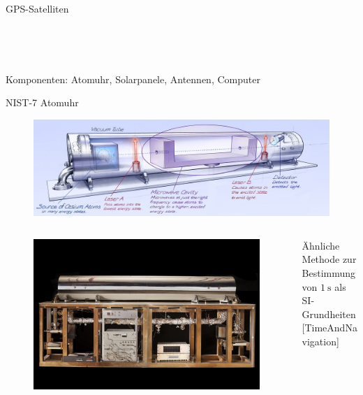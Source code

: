 \begin{frame}{GPS-Satelliten}
\begin{columns}
\begin{column}{0.5\textwidth}
\begin{figure}
            \end{figure}
        \end{column}
    \end{columns}~\\~\\
    Komponenten: Atomuhr, Solarpanele, Antennen, Computer \;
\end{frame}

\begin{frame}{NIST-7 Atomuhr}
    \begin{figure}
        \centering
        \includegraphics[width=\textwidth]{images/nist-7.jpg}
    \end{figure}
    \begin{columns}
        \begin{column}{0.5\textwidth}
            \begin{figure}
                \centering
                \includegraphics[height=0.4\textheight]{images/nist-7-real.jpg}
            \end{figure}
        \end{column}
        \begin{column}{0.5\textwidth}
            Ähnliche Methode zur Bestimmung\\
            von $\SI{1}{\second}$ als SI-Grundheiten\\
            {\small [TimeAndNavigation]}
        \end{column}
    \end{columns}
\end{frame}
